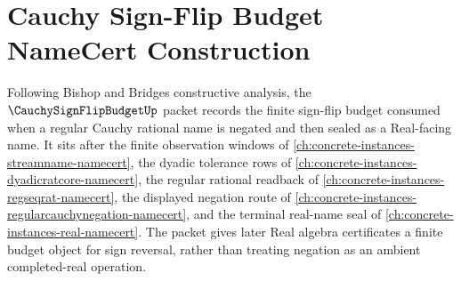 \chapter{Cauchy Sign-Flip Budget NameCert Construction}
\label{ch:concrete-instances-cauchy-sign-flip-budget-namecert}

Following Bishop and Bridges constructive analysis, the $\CauchySignFlipBudgetUp$ packet records the finite sign-flip budget consumed when a regular Cauchy rational name is negated and then sealed as a Real-facing name. It sits after the finite observation windows of \autoref{ch:concrete-instances-streamname-namecert}, the dyadic tolerance rows of \autoref{ch:concrete-instances-dyadicratcore-namecert}, the regular rational readback of \autoref{ch:concrete-instances-regseqrat-namecert}, the displayed negation route of \autoref{ch:concrete-instances-regularcauchynegation-namecert}, and the terminal real-name seal of \autoref{ch:concrete-instances-real-namecert}. The packet gives later Real algebra certificates a finite budget object for sign reversal, rather than treating negation as an ambient completed-real operation.

